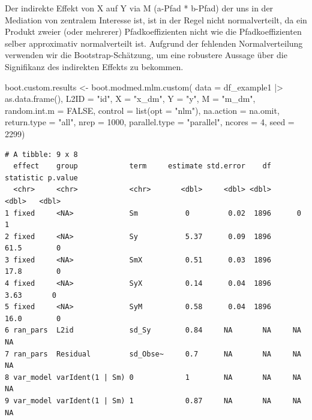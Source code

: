 \documentclass[
  letterpaper,
  DIV=11,
  numbers=noendperiod]{scrreprt}
\newenvironment{Shaded}{\begin{snugshade}}{\end{snugshade}}
\newcommand{\AttributeTok}[1]{\textcolor[rgb]{0.40,0.45,0.13}{#1}}
\newcommand{\CommentTok}[1]{\textcolor[rgb]{0.37,0.37,0.37}{#1}}
\newcommand{\ConstantTok}[1]{\textcolor[rgb]{0.56,0.35,0.01}{#1}}
\newcommand{\DecValTok}[1]{\textcolor[rgb]{0.68,0.00,0.00}{#1}}
\newcommand{\FunctionTok}[1]{\textcolor[rgb]{0.28,0.35,0.67}{#1}}
\newcommand{\NormalTok}[1]{\textcolor[rgb]{0.00,0.23,0.31}{#1}}
\newcommand{\OtherTok}[1]{\textcolor[rgb]{0.00,0.23,0.31}{#1}}
\newcommand{\SpecialCharTok}[1]{\textcolor[rgb]{0.37,0.37,0.37}{#1}}
\newcommand{\StringTok}[1]{\textcolor[rgb]{0.13,0.47,0.30}{#1}}
\begin{document}
Der indirekte Effekt von X auf Y via M (a-Pfad * b-Pfad) der uns in der
Mediation von zentralem Interesse ist, ist in der Regel nicht
normalverteilt, da ein Produkt zweier (oder mehrerer) Pfadkoeffizienten
nicht wie die Pfadkoeffizienten selber approximativ normalverteilt ist.
Aufgrund der fehlenden Normalverteilung verwenden wir die
Bootstrap-Schätzung, um eine robustere Aussage über die Signifikanz des
indirekten Effekts zu bekommen.

\begin{Shaded}
\begin{Highlighting}[]
\NormalTok{boot.custom.results }\OtherTok{\textless{}{-}} \FunctionTok{boot.modmed.mlm.custom}\NormalTok{(}
  \AttributeTok{data =}\NormalTok{ df\_example1 }\SpecialCharTok{|\textgreater{}} \FunctionTok{as.data.frame}\NormalTok{(),}
  \AttributeTok{L2ID =} \StringTok{"id"}\NormalTok{,}
  \AttributeTok{X =} \StringTok{"x\_dm"}\NormalTok{,}
  \AttributeTok{Y =} \StringTok{"y"}\NormalTok{,}
  \AttributeTok{M =} \StringTok{"m\_dm"}\NormalTok{,}
  \AttributeTok{random.int.m =} \ConstantTok{FALSE}\NormalTok{,}
  \AttributeTok{control =} \FunctionTok{list}\NormalTok{(}\AttributeTok{opt =} \StringTok{"nlm"}\NormalTok{),}
  \AttributeTok{na.action =}\NormalTok{ na.omit,}
  \AttributeTok{return.type =} \StringTok{"all"}\NormalTok{,}
  \AttributeTok{nrep =} \DecValTok{1000}\NormalTok{,}
  \AttributeTok{parallel.type =} \StringTok{"parallel"}\NormalTok{,}
  \AttributeTok{ncores =} \DecValTok{4}\NormalTok{,}
  \AttributeTok{seed =} \DecValTok{2299}\NormalTok{)}
\end{Highlighting}
\end{Shaded}

\begin{Shaded}
\end{Shaded}

\begin{verbatim}
# A tibble: 9 x 8
  effect    group            term     estimate std.error    df statistic p.value
  <chr>     <chr>            <chr>       <dbl>     <dbl> <dbl>     <dbl>   <dbl>
1 fixed     <NA>             Sm           0         0.02  1896      0          1
2 fixed     <NA>             Sy           5.37      0.09  1896     61.5        0
3 fixed     <NA>             SmX          0.51      0.03  1896     17.8        0
4 fixed     <NA>             SyX          0.14      0.04  1896      3.63       0
5 fixed     <NA>             SyM          0.58      0.04  1896     16.0        0
6 ran_pars  L2id             sd_Sy        0.84     NA       NA     NA         NA
7 ran_pars  Residual         sd_Obse~     0.7      NA       NA     NA         NA
8 var_model varIdent(1 | Sm) 0            1        NA       NA     NA         NA
9 var_model varIdent(1 | Sm) 1            0.87     NA       NA     NA         NA
\end{verbatim}
\end{document}
